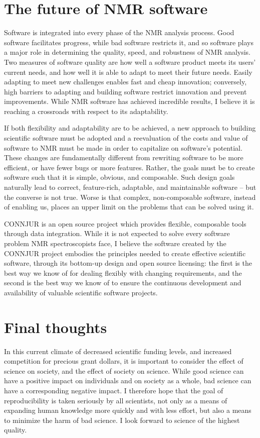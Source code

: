 \section{The future of NMR software}
Software is integrated into every phase of the NMR analysis process.
Good software facilitates progress, while bad software restricts it, and so
software plays a major role in determining the quality, speed, and 
robustness of NMR analysis.  Two measures of software quality are how well a 
software product meets its users' current needs, and how well it is able to
adapt to meet their future needs.  Easily adapting to meet new 
challenges enables fast and cheap innovation; conversely, high
barriers to adapting and building software restrict innovation and prevent
improvements.  While NMR software has achieved incredible results, I believe
it is reaching a crossroads with respect to its adaptability.

If both flexibility and adaptability are to be achieved,
a new approach to building scientific software must be adopted and 
a reevaluation of the costs and value of software to NMR must be made 
in order to capitalize on software's potential.  
These changes are fundamentally different from rewriting software
to be more efficient, or have fewer bugs or more features.  Rather, the
goals must be to create software such that it is simple, obvious, and 
composable.  Such design goals naturally lead to correct, feature-rich, 
adaptable, and maintainable software -- but the converse is not true.  Worse
is that complex, non-composable software, instead of enabling
us, places an upper limit on the problems that can be solved using it.

CONNJUR is an open source project which provides flexible, composable tools
through data integration.  While it is not expected to solve every software
problem NMR spectroscopists face, I believe the software created by the CONNJUR
project embodies the principles needed to create effective scientific
software, through its bottom-up design and open source licensing:
the first is the best way we know of for dealing flexibly with changing
requirements, and the second is the best way we know of to ensure the 
continuous development and availability of valuable scientific software
projects.


\section{Final thoughts}
In this current climate of decreased scientific funding levels, and increased
competition for precious grant dollars, it is important to consider the effect
of science on society, and the effect of society on science.
While good science can have a positive impact on individuals and on society 
as a whole, bad science can have a corresponding negative impact.
I therefore hope that the goal of reproducibility is taken seriously by all
scientists, not only as a means of expanding human knowledge more quickly and
with less effort, but also a means to minimize the harm of bad science.
I look forward to science of the highest quality.


